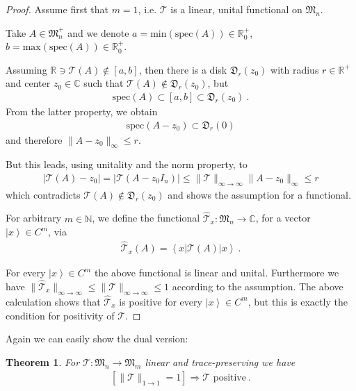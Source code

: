 \documentclass[a4paper
               ,12pt
               ,DIV=12
               ,oneside
               ]
               {amsart}
\theoremstyle{plain}
\newtheorem{thm}{Theorem}
\theoremstyle{remark}
\def\ra{\rightarrow}
\def\lb{\left(}
\def\rb{\right)}
\def\lk{\left\langle}
\def\rk{\right\rangle}
\def\l|{\left|}
\def\r|{\right|}
\def\lbr{\left[}
\def\rbr{\right]}
\newcommand\C{\mathbb{C}}
\newcommand\R{\mathbb{R}}
\newcommand\N{\mathbb{N}}
\newcommand\M{\mathfrak{M}}
\newcommand{\Tm}{\mathcal{T}}
\begin{document}
\begin{proof}

Assume first that $m=1$, i.e. $\Tm$ is a linear, unital functional on $\M_n$.

Take $A\in\M^+_n$ and we denote $a=\text{min}\lb\text{spec}\lb A\rb\rb\in\R_0^{+}$, $b=\text{max}\lb\text{spec}\lb A\rb\rb\in\R_0^{+}$. 

Assuming $\R\ni\Tm\lb A\rb\notin\lbr a,b\rbr$, then there is a disk $\mathfrak{D}_r\lb z_0\rb$ with radius $r\in\R^+$ and center $z_0\in\C$ such that $\Tm\lb A\rb\notin \mathfrak{D}_r\lb z_0\rb$, but
\begin{align*}
\text{spec}\lb A\rb\subset\lbr a,b\rbr\subset \mathfrak{D}_r\lb z_0\rb\medspace .
\end{align*} 
From the latter property, we obtain
\begin{align*}
\text{spec}\lb A-z_0\rb\subset \mathfrak{D}_r\lb 0\rb 
\end{align*}
and therefore $\| A-z_0\|_\infty\leq r$.

But this leads, using unitality and the norm property, to 
\begin{align*}
\l| \Tm\lb A\rb - z_0\r|= \l| \Tm\lb A - z_0 I_n\rb\r|\leq \|\Tm\|_{\infty\ra\infty}\| A-z_0\|_\infty\leq r
\end{align*}
which contradicts $\Tm\lb A\rb\notin \mathfrak{D}_r\lb z_0\rb$ and shows the assumption for a functional. 

For arbitrary $m\in\N$, we define the functional $\widehat{\Tm}_x:\M_n\ra\C$, for a vector $\l|x\rk\in C^m$, via
\begin{align*}
\widehat{\Tm}_x\lb A\rb = \lk x\r|\Tm\lb A\rb\l| x\rk\medspace .
\end{align*}

For every $\l|x\rk\in C^m$ the above functional is linear and unital. Furthermore we have $\| \widehat{\Tm}_x\|_{\infty\ra\infty}\leq \| \Tm\|_{\infty\ra\infty}\leq 1$ according to the assumption. The above calculation shows that $\widehat{\Tm}_x$ is positive for every $\l|x\rk\in C^m$, but this is exactly the condition for positivity of $\Tm$.

\end{proof}

Again we can easily show the dual version:

\begin{thm}

For $\Tm :\M_n\ra\M_m$ linear and trace-preserving we have
\begin{align*}
\lbr\| \Tm\|_{1\ra 1} = 1\rbr \Rightarrow \Tm\text{ positive}\medspace.
\end{align*}
\label{thm:RussoDyeBack2}
\end{thm} 
\end{document}
